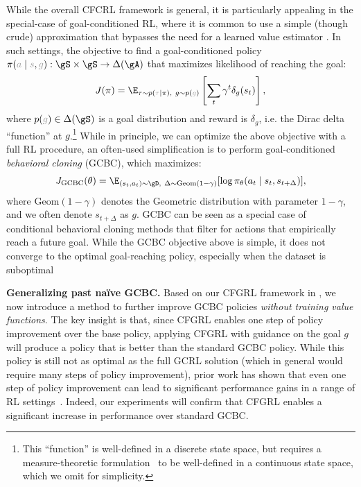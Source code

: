 \documentclass{article}
\newcommand{\pl}[1]{{\color{plgray} #1}}
\begin{document}
While the overall CFCRL framework is general, it is particularly appealing in the special-case of goal-conditioned RL, where it is common to use a simple (though crude) approximation that bypasses the need for a learned value estimator \citep{ocbc_eysenbach2022, gcsl_ghosh2021, susie_black2024}. In such settings, the objective to find a goal-conditioned policy $\pi(\pl{a} \mid \pl{s}, \pl{g}): \gS \times \gS \to \Delta(\gA)$ that maximizes likelihood of reaching the goal:
\begin{equation}
    J(\pi) = \E_{\tau \sim p(\pl{\tau} \mid \pi),\ g \sim p(\pl{g})}\left[\sum_t \gamma^t \delta_g(s_t) \right],
    \label{eq:goal-reaching}
\end{equation}
where $p(\pl{g}) \in \Delta(\gS)$ is a goal distribution
and reward is $\delta_g$, i.e. the Dirac delta ``function'' at $g$.\footnote{This ``function'' is well-defined in a discrete state space, but requires a measure-theoretic formulation~\citep{fb_touati2021} to be well-defined in a continuous state space, which we omit for simplicity.}
While in principle, we can optimize the above objective with a full RL procedure, an often-used simplification is to perform goal-conditioned \textit{behavioral cloning} (GCBC), which maximizes:
\begin{equation}
    J_\mathrm{GCBC}(\theta) = \E_{\substack{(s_t, a_t) \sim \gD,\ \Delta \sim \mathrm{Geom}(1-\gamma)}}[\log \pi_\theta(a_t \mid s_t, s_{t+\Delta})], \label{eq:gcbc_obj}
\end{equation}
where $\mathrm{Geom}(1-\gamma)$ denotes the Geometric distribution with parameter $1 - \gamma$,
and we often denote $s_{t+\Delta}$ as $g$.
GCBC can be seen as a special case of conditional behavioral cloning methods that filter for actions that empirically reach a future goal.
While the GCBC objective above is simple,
it does not converge to the optimal goal-reaching policy, especially when the dataset is suboptimal~\citep{ocbc_eysenbach2022, ocbc_ghugare2024}

\textbf{Generalizing past na\"ive GCBC.}
Based on our CFGRL framework in ,
we now introduce a method to further improve GCBC policies
\emph{without training value functions}.
The key insight is that, since CFGRL enables one step of policy improvement over the base policy,
applying CFGRL with guidance on the goal $g$ will produce a policy that is better than the standard GCBC policy.
While this policy is still not as optimal as the full GCRL solution (which in general would require many steps of policy improvement),
prior work has shown that even one step of policy improvement can lead to significant performance gains in a range of RL settings~\citep{onestep_brandfonbrener2021, crl_eysenbach2022}.
Indeed, our experiments will confirm that CFGRL enables a significant increase in performance over standard GCBC.
\end{document}
